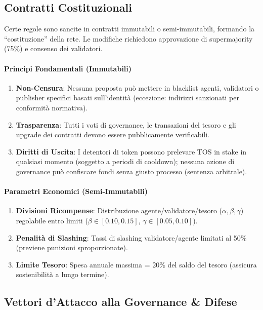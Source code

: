 \documentclass[11pt]{article}
\begin{document}
\begin{itemize}[noitemsep]
\subsection{Contratti Costituzionali}

Certe regole sono sancite in contratti immutabili o semi-immutabili, formando la ``costituzione'' della rete. Le modifiche richiedono approvazione di supermajority (75\%) e consenso dei validatori.

\paragraph{Principi Fondamentali (Immutabili)}
\begin{enumerate}[noitemsep]
  \item \textbf{Non-Censura}: Nessuna proposta può mettere in blacklist agenti, validatori o publisher specifici basati sull'identità (eccezione: indirizzi sanzionati per conformità normativa).
  \item \textbf{Trasparenza}: Tutti i voti di governance, le transazioni del tesoro e gli upgrade dei contratti devono essere pubblicamente verificabili.
  \item \textbf{Diritti di Uscita}: I detentori di token possono prelevare TOS in stake in qualsiasi momento (soggetto a periodi di cooldown); nessuna azione di governance può confiscare fondi senza giusto processo (sentenza arbitrale).
\end{enumerate}

\paragraph{Parametri Economici (Semi-Immutabili)}
\begin{enumerate}[noitemsep]
  \item \textbf{Divisioni Ricompense}: Distribuzione agente/validatore/tesoro ($\alpha, \beta, \gamma$) regolabile entro limiti ($\beta \in [0.10, 0.15]$, $\gamma \in [0.05, 0.10]$).
  \item \textbf{Penalità di Slashing}: Tassi di slashing validatore/agente limitati al 50\% (previene punizioni sproporzionate).
  \item \textbf{Limite Tesoro}: Spesa annuale massima = 20\% del saldo del tesoro (assicura sostenibilità a lungo termine).
\end{enumerate}

\subsection{Vettori d'Attacco alla Governance \& Difese}


\end{itemize}
\end{document}
